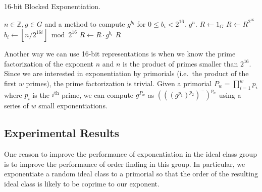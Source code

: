 \documentclass{ucalgthes1}
\theoremstyle{definition}
\newcommand{\ZZ}{\mathbb{Z}}
\newcommand{\floor}[1]{\left\lfloor #1 \right\rfloor}
\newcommand{\ceil}[1]{\left\lceil #1 \right\rceil}
\begin{document}
\begin{algorithm}[H]
\caption{16-bit Blocked Exponentiation.}
\label{alg:blockedExp}
\begin{algorithmic}[1]
\REQUIRE $n \in \ZZ, g \in G$ and a method to compute $g^{b_i}$ for $0 \le b_i < 2^{16}$.
\ENSURE $g^n$.
\STATE $R \gets 1_G$
\FOR {$i$ from $\ceil{\log_{2^{16}} n}$ downto 0}
	\STATE $R \gets R^{2^{16}}$ 
	\STATE $b_i \gets \floor{n / 2^{16i}} \bmod {2^{16}}$
	\STATE $R \gets R \cdot g^{b_i}$
\ENDFOR
\RETURN $R$
\end{algorithmic}
\end{algorithm}

Another way we can use 16-bit representations is when we know the prime factorization of the exponent $n$ and $n$ is the product of primes smaller than $2^{16}$.  Since we are interested in exponentiation by primorials (i.e.\ the product of the first $w$ primes), the prime factorization is trivial. Given a primorial $P_w = \prod_{i=1}^w p_i$ where $p_i$ is the $i^{\textrm{th}}$ prime, we can compute $g^{P_w}$ as $(((g^{p_1})^{p_2})^{\cdots})^{p_w}$ using a series of $w$ small exponentiations.

\subsection{Experimental Results}

One reason to improve the performance of exponentiation in the ideal class group is to improve the performance of order finding in this group.  In particular, we exponentiate a random ideal class to a primorial so that the order of the resulting ideal class is likely to be coprime to our exponent.
\end{document}
